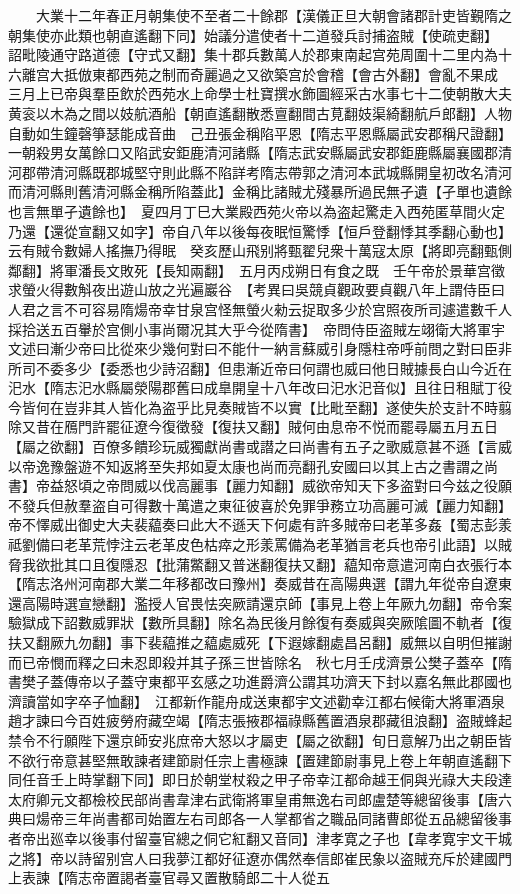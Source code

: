 　　大業十二年春正月朝集使不至者二十餘郡【漢儀正旦大朝會諸郡計吏皆覲隋之朝集使亦此類也朝直遙翻下同】始議分遣使者十二道發兵討捕盗賊【使疏吏翻】　詔毗陵通守路道德【守式又翻】集十郡兵數萬人於郡東南起宫苑周圍十二里内為十六離宫大抵倣東都西苑之制而奇麗過之又欲築宫於會稽【會古外翻】會亂不果成　三月上已帝與羣臣飲於西苑水上命學士杜寶撰水飾圖經采古水事七十二使朝散大夫黄衮以木為之間以妓航酒船【朝直遙翻散悉亶翻間古莧翻妓渠綺翻航戶郎翻】人物自動如生鐘磬箏瑟能成音曲　己丑張金稱陷平恩【隋志平恩縣屬武安郡稱尺證翻】一朝殺男女萬餘口又陷武安鉅鹿清河諸縣【隋志武安縣屬武安郡鉅鹿縣屬襄國郡清河郡帶清河縣既郡城堅守則此縣不陷詳考隋志帶郭之清河本武城縣開皇初改名清河而清河縣則舊清河縣金稱所陷蓋此】金稱比諸賊尤殘暴所過民無孑遺【孑單也遺餘也言無單孑遺餘也】　夏四月丁巳大業殿西苑火帝以為盗起驚走入西苑匿草間火定乃還【還從宣翻又如字】帝自八年以後每夜眠恒驚悸【恒戶登翻悸其季翻心動也】云有賊令數婦人搖撫乃得眠　癸亥歷山飛别將甄翟兒衆十萬寇太原【將即亮翻甄側鄰翻】將軍潘長文敗死【長知兩翻】　五月丙戍朔日有食之既　壬午帝於景華宫徵求螢火得數斛夜出遊山放之光遍巖谷　【考異曰吳競貞觀政要貞觀八年上謂侍臣曰人君之言不可容易隋煬帝幸甘泉宫怪無螢火勑云捉取多少於宫照夜所司遽遣數千人採拾送五百轝於宫側小事尚爾况其大乎今從隋書】　帝問侍臣盗賊左翊衛大將軍宇文述曰漸少帝曰比從來少幾何對曰不能什一納言蘇威引身隱柱帝呼前問之對曰臣非所司不委多少【委悉也少詩沼翻】但患漸近帝曰何謂也威曰他日賊據長白山今近在汜水【隋志汜水縣屬滎陽郡舊曰成臯開皇十八年改曰汜水汜音似】且往日租賦丁役今皆何在豈非其人皆化為盗乎比見奏賊皆不以實【比毗至翻】遂使失於支計不時翦除又昔在鴈門許罷征遼今復徵發【復扶又翻】賊何由息帝不悦而罷尋屬五月五日【屬之欲翻】百僚多饋珍玩威獨獻尚書或譛之曰尚書有五子之歌威意甚不遜【言威以帝逸豫盤遊不知返將至失邦如夏太康也尚而亮翻孔安國曰以其上古之書謂之尚書】帝益怒頃之帝問威以伐高麗事【麗力知翻】威欲帝知天下多盗對曰今兹之役願不發兵但赦羣盗自可得數十萬遣之東征彼喜於免罪爭務立功高麗可滅【麗力知翻】帝不懌威出御史大夫裴藴奏曰此大不遜天下何處有許多賊帝曰老革多姦【蜀志彭羕祗劉備曰老革荒悖注云老革皮色枯瘁之形羕罵備為老革猶言老兵也帝引此語】以賊脅我欲批其口且復隱忍【批蒲鱉翻又普迷翻復扶又翻】藴知帝意遣河南白衣張行本【隋志洛州河南郡大業二年移都改曰豫州】奏威昔在高陽典選【謂九年從帝自遼東還高陽時選宣戀翻】濫授人官畏怯突厥請還京師【事見上卷上年厥九勿翻】帝令案驗獄成下詔數威罪狀【數所具翻】除名為民後月餘復有奏威與突厥隂圖不軌者【復扶又翻厥九勿翻】事下裴藴推之藴處威死【下遐嫁翻處昌呂翻】威無以自明但摧謝而已帝憫而釋之曰未忍即殺并其子孫三世皆除名　秋七月壬戌濟景公樊子蓋卒【隋書樊子蓋傳帝以子蓋守東都平玄感之功進爵濟公謂其功濟天下封以嘉名無此郡國也濟讀當如字卒子恤翻】　江都新作龍舟成送東都宇文述勸幸江都右候衛大將軍酒泉趙才諫曰今百姓疲勞府藏空竭【隋志張掖郡福祿縣舊置酒泉郡藏徂浪翻】盗賊蜂起禁令不行願陛下還京師安兆庶帝大怒以才屬吏【屬之欲翻】旬日意解乃出之朝臣皆不欲行帝意甚堅無敢諫者建節尉任宗上書極諫【置建節尉事見上卷上年朝直遙翻下同任音壬上時掌翻下同】即日於朝堂杖殺之甲子帝幸江都命越王侗與光祿大夫段達太府卿元文都檢校民部尚書韋津右武衛將軍皇甫無逸右司郎盧楚等總留後事【唐六典曰煬帝三年尚書都司始置左右司郎各一人掌都省之職品同諸曹郎從五品總留後事者帝出廵幸以後事付留臺官總之侗它紅翻又音同】津孝寛之子也【韋孝寛宇文干城之將】帝以詩留别宫人曰我夢江都好征遼亦偶然奉信郎崔民象以盗賊充斥於建國門上表諫【隋志帝置謁者臺官尋又置散騎郎二十人從五